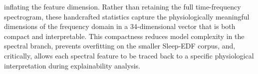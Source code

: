 \documentclass{ieeetj}
\begin{document}
inflating the feature dimension. Rather than retaining the full time-frequency spectrogram, these handcrafted statistics capture the physiologically meaningful dimensions of the frequency domain in a 34-dimensional vector that is both compact and interpretable. This compactness reduces model complexity in the spectral branch, prevents overfitting on the smaller Sleep-EDF corpus, and, critically, allows each spectral feature to be traced back to a specific physiological interpretation during explainability analysis.

\end{document}
